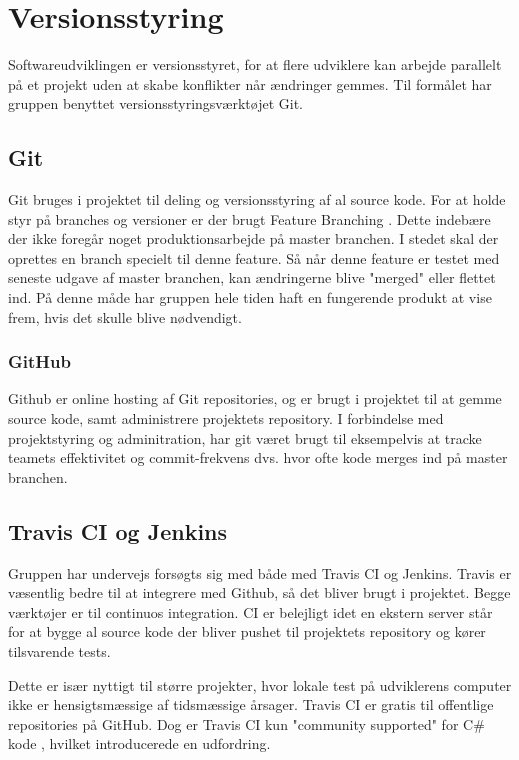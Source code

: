 \section{Versionsstyring}
Softwareudviklingen er versionsstyret, for at flere udviklere kan arbejde parallelt på et projekt uden at skabe konflikter når ændringer gemmes. Til formålet har gruppen benyttet versionsstyringsværktøjet Git.

\subsection{Git}
Git bruges i projektet til deling og versionsstyring af al source kode.
For at holde styr på branches og versioner er der brugt Feature Branching \cite{atlassian2016}. Dette indebære der ikke foregår noget produktionsarbejde på master branchen. I stedet skal der oprettes en branch specielt til denne feature. Så når denne feature er testet med seneste udgave af master branchen, kan ændringerne blive "merged" eller flettet ind. På denne måde har gruppen hele tiden haft en fungerende produkt at vise frem, hvis det skulle blive nødvendigt.

\subsubsection{GitHub}
Github er online hosting af Git repositories, og er brugt i projektet til at gemme source kode, samt administrere projektets repository. I forbindelse med projektstyring og adminitration, har git været brugt til eksempelvis at tracke teamets effektivitet og commit-frekvens dvs. hvor ofte kode merges ind på master branchen.

\subsection{Travis CI og Jenkins} 
Gruppen har undervejs forsøgts sig med både med Travis CI og Jenkins. Travis er væsentlig bedre til at integrere med Github, så det bliver brugt i projektet.
Begge værktøjer er til continuos integration. CI er belejligt idet en ekstern server står for at bygge al source kode der bliver pushet til projektets repository og kører tilsvarende tests.

Dette er især nyttigt til større projekter, hvor lokale test på udviklerens computer ikke er hensigtsmæssige af tidsmæssige årsager. Travis CI er gratis til offentlige repositories på GitHub. Dog er Travis CI kun "community supported" for C\# kode \cite{communitysupportedlanguages2016}, hvilket introducerede en udfordring.

